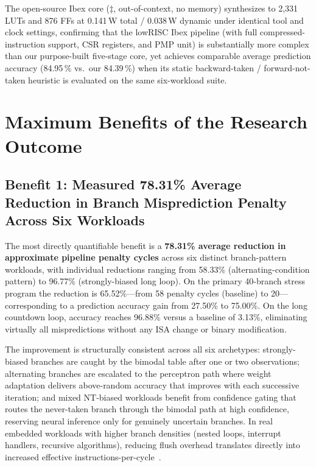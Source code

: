 \documentclass[12pt,a4paper]{article}
\begin{document}
The open-source Ibex core ($\ddagger$, out-of-context, no memory) synthesizes
to 2{,}331 LUTs and 876 FFs at 0.141\,W total / 0.038\,W dynamic under identical
tool and clock settings, confirming that the lowRISC Ibex pipeline (with full
compressed-instruction support, CSR registers, and PMP unit) is substantially
more complex than our purpose-built five-stage core, yet achieves comparable
average prediction accuracy (84.95\,\% vs.\  our 84.39\,\%) when its
static backward-taken / forward-not-taken heuristic is evaluated on the same
six-workload suite.

\section{Maximum Benefits of the Research Outcome}
\label{sec:benefits}

\subsection*{Benefit 1: Measured 78.31\% Average Reduction in Branch Misprediction Penalty Across Six Workloads}

The most directly quantifiable benefit is a \textbf{78.31\% average reduction in
approximate pipeline penalty cycles} across six distinct branch-pattern workloads,
with individual reductions ranging from 58.33\% (alternating-condition pattern) to
96.77\% (strongly-biased long loop). On the primary 40-branch stress program the
reduction is 65.52\%---from 58 penalty cycles (baseline) to 20---corresponding
to a prediction accuracy gain from 27.50\% to 75.00\%. On the long countdown loop,
accuracy reaches 96.88\% versus a baseline of 3.13\%, eliminating virtually all
mispredictions without any ISA change or binary modification.

The improvement is structurally consistent across all six archetypes: strongly-biased
branches are caught by the bimodal table after one or two observations; alternating
branches are escalated to the perceptron path where weight adaptation delivers
above-random accuracy that improves with each successive iteration; and mixed
NT-biased workloads benefit from confidence gating that routes the never-taken
branch through the bimodal path at high confidence, reserving neural inference only
for genuinely uncertain branches. In real embedded workloads with higher branch
densities (nested loops, interrupt handlers, recursive algorithms), reducing flush
overhead translates directly into increased effective instructions-per-cycle~\cite{hennessy2017quantitative}.
\end{document}
